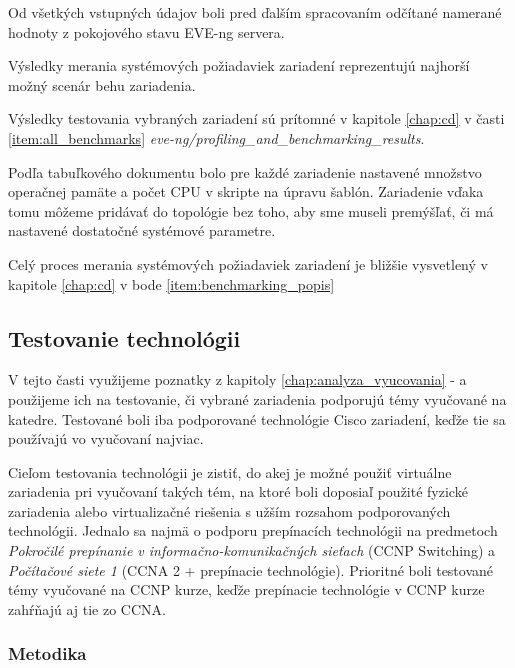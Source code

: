 Od všetkých vstupných údajov boli pred ďalším spracovaním odčítané namerané hodnoty z pokojového stavu EVE-ng servera.

Výsledky merania systémových požiadaviek zariadení reprezentujú najhorší možný scenár behu zariadenia.

Výsledky testovania vybraných zariadení sú prítomné v kapitole \ref{chap:cd} v časti \ref{item:all_benchmarks} \emph{eve-ng/profiling\_and\_benchmarking\_results}.

Podľa tabuľkového dokumentu bolo pre každé zariadenie nastavené množstvo operačnej pamäte a počet CPU v skripte na úpravu šablón. Zariadenie vďaka tomu môžeme pridávať do topológie bez toho, aby sme museli premýšľať, či má nastavené dostatočné systémové parametre.

Celý proces merania systémových požiadaviek zariadení je bližšie vysvetlený v kapitole \ref{chap:cd} v bode \ref{item:benchmarking_popis}





\subsection{Testovanie technológii}
\label{chap:testovanie_technologii}

V tejto časti využijeme poznatky z kapitoly \ref{chap:analyza_vyucovania} -  a použijeme ich na testovanie, či vybrané zariadenia podporujú témy vyučované na katedre. Testované boli iba podporované technológie Cisco zariadení, keďže tie sa používajú vo vyučovaní najviac.

Cieľom testovania technológii je zistiť, do akej je možné použiť virtuálne zariadenia pri vyučovaní takých tém, na ktoré boli doposiaľ použité fyzické zariadenia alebo virtualizačné riešenia s užším rozsahom podporovaných technológii. Jednalo sa najmä o podporu prepínacích technológii na predmetoch \emph{Pokročilé prepínanie v informačno-komunikačných sieťach} (CCNP Switching) a \emph{Počítačové siete 1} (CCNA 2 + prepínacie technológie). Prioritné boli testované témy vyučované na CCNP kurze, keďže prepínacie technológie v CCNP kurze zahŕňajú aj tie zo CCNA.





\subsubsection{Metodika}

